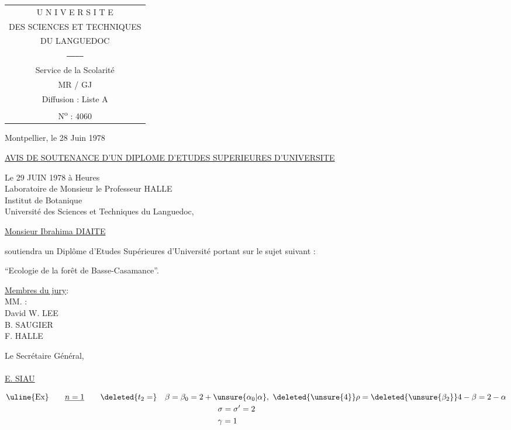 \begin{tabular}{c}
U N I V E R S I T E\\
DES SCIENCES ET TECHNIQUES\\
DU LANGUEDOC\\
\texttt{------------}\\
Service de la Scolarité\\
MR / GJ\\
Diffusion \quad : Liste A\\
N\textsuperscript{o} : 4060
\end{tabular}

Montpellier, le 28 Juin 1978

\uline{AVIS DE SOUTENANCE D'UN DIPLOME D'ETUDES SUPERIEURES D'UNIVERSITE}

Le 29 JUIN 1978 \qquad à  Heures\\
Laboratoire de Monsieur le Professeur HALLE\\
Institut de Botanique\\
Université des Sciences et Techniques du Languedoc,

\uline{Monsieur Ibrahima DIAITE}

soutiendra un Diplôme d'Etudes Supérieures d'Université portant sur le sujet suivant :

``Ecologie de la forêt de Basse-Casamance''.

\uline{Membres du jury}:\\
MM. :\\
\hspace*{1em}David W. LEE\\
\hspace*{1em}B. SAUGIER\\
\hspace*{1em}F. HALLE

Le Secrétaire Général,\\

\\

\uline{E. SIAU}

\[
\begin{aligned}
\text{\uline{Ex}}\qquad\underline{n=1}\qquad
\deleted{t_2=}\quad
\beta&=\beta_0=2+\unsure{\alpha_0|\alpha},\ \deleted{\unsure{4}}\rho=\deleted{\unsure{\beta_2}}4-\beta=2-\alpha\\
&\hspace{6em}\sigma=\sigma'=2\\
&\hspace{6em}\gamma=1
\end{aligned}
\]

